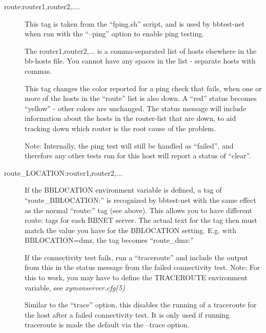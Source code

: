 \begin{description}
 

\item[route:router1,router2,....] This tag is taken from the ``fping.sh'' script, and is used by bbtest-net when run with the ``--ping'' option to enable ping testing. 

  The router1,router2,... is a comma-separated list of hosts elsewhere in the bb-hosts file. You cannot have any spaces in the list - separate hosts with commas. 


  This tag changes the color reported for a ping check that fails,
  when one or more of the hosts in the ``route'' list is also down. A
  ``red'' status becomes ``yellow'' - other colors are unchanged. The
  status message will include information about the hosts in the
  router-list that are down, to aid tracking down which router is the
  root cause of the problem. 



  Note: Internally, the ping test will still be handled as ``failed'',
  and therefore any other tests run for this host will report a status
  of ``clear''. 



 

\item[route\_LOCATION:router1,router2,...] If the BBLOCATION
  environment variable is defined, a tag of ``route\_BBLOCATION:'' is
  recognized by bbtest-net with the same effect as the normal
  ``route:'' tag (see above). This allows you to have different route:
  tags for each BBNET server. The actual text for the tag then must
  match the value you have for the BBLOCATION setting. E.g. with
  BBLOCATION=dmz, the tag becomes ``route\_dmz:'' 


 

\item[] If the connectivity test fails, run a ``traceroute'' and
  include the output from this in the status message from the failed
  connectivity test. Note: For this to work, you may have to define
  the TRACEROUTE environment variable, see \emph{xymonserver.cfg(5)}



 

\item[] Similar to the ``trace'' option, this disables the
  running of a traceroute for the host after a failed connectivity
  test. It is only used if running traceroute is made the default via
  the --trace option. 


 


\end{description}

